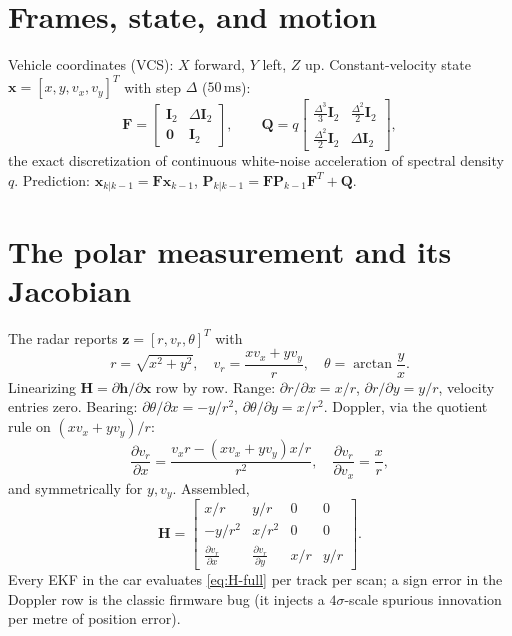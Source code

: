 \documentclass[11pt,oneside]{book}
\begin{document}
\section{Frames, state, and motion}
\label{sec:frames}

Vehicle coordinates (VCS): $X$ forward, $Y$ left, $Z$ up. Constant-velocity
state $\mathbf{x}=[x,y,v_x,v_y]^T$ with step $\Delta$ ($50\,\mathrm{ms}$):
\begin{equation}
\mathbf{F}=\begin{bmatrix}\mathbf{I}_2&\Delta\mathbf{I}_2\\\mathbf{0}&\mathbf{I}_2\end{bmatrix},
\qquad
\mathbf{Q}=q\begin{bmatrix}\tfrac{\Delta^3}{3}\mathbf{I}_2&\tfrac{\Delta^2}{2}\mathbf{I}_2\\
\tfrac{\Delta^2}{2}\mathbf{I}_2&\Delta\mathbf{I}_2\end{bmatrix},
\label{eq:cv-model}
\end{equation}
the exact discretization of continuous white-noise acceleration of spectral
density $q$. Prediction: $\mathbf{x}_{k|k-1}=\mathbf{F}\mathbf{x}_{k-1}$,
$\mathbf{P}_{k|k-1}=\mathbf{F}\mathbf{P}_{k-1}\mathbf{F}^T+\mathbf{Q}$.

\section{The polar measurement and its Jacobian}
\label{sec:jacobian}

The radar reports $\mathbf{z}=[r,v_r,\theta]^T$ with
\begin{equation}
r=\sqrt{x^2+y^2},\quad
v_r=\frac{xv_x+yv_y}{r},\quad
\theta=\arctan\frac{y}{x}.
\label{eq:h}
\end{equation}
Linearizing $\mathbf{H}=\partial\mathbf{h}/\partial\mathbf{x}$ row by row.
Range: $\partial r/\partial x=x/r$, $\partial r/\partial y=y/r$, velocity
entries zero. Bearing: $\partial\theta/\partial x=-y/r^2$,
$\partial\theta/\partial y=x/r^2$. Doppler, via the quotient rule on
$(xv_x+yv_y)/r$:
\begin{equation}
\frac{\partial v_r}{\partial x}
=\frac{v_xr-(xv_x+yv_y)x/r}{r^2},\quad
\frac{\partial v_r}{\partial v_x}=\frac{x}{r},
\label{eq:doppler-jac}
\end{equation}
and symmetrically for $y,v_y$. Assembled,
\begin{equation}
\mathbf{H}=\begin{bmatrix}
x/r & y/r & 0 & 0\\
-y/r^2 & x/r^2 & 0 & 0\\
\frac{\partial v_r}{\partial x} & \frac{\partial v_r}{\partial y} & x/r & y/r
\end{bmatrix}.
\label{eq:H-full}
\end{equation}
Every EKF in the car evaluates \cref{eq:H-full} per track per scan; a sign
error in the Doppler row is the classic firmware bug (it injects a
$4\sigma$-scale spurious innovation per metre of position error).
\end{document}
